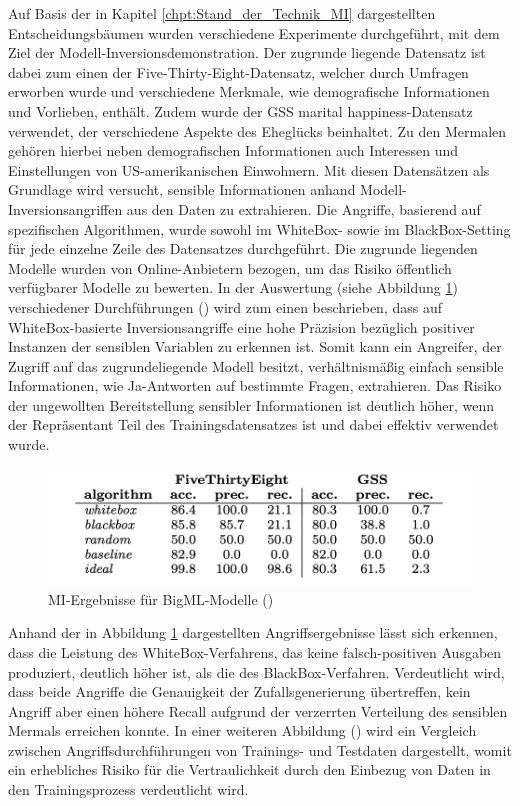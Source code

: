 Auf Basis der in Kapitel \ref{chpt:Stand_der_Technik_MI} dargestellten Entscheidungsbäumen wurden verschiedene Experimente durchgeführt, mit dem Ziel der Modell-Inversionsdemonstration. Der zugrunde liegende Datensatz ist dabei zum einen der \glqq Five-Thirty-Eight\grqq{}-Datensatz, welcher durch Umfragen erworben wurde und verschiedene Merkmale, wie demografische Informationen und Vorlieben, enthält. Zudem wurde der \glqq GSS marital happiness\grqq{}-Datensatz verwendet, der verschiedene Aspekte des Eheglücks beinhaltet. Zu den Mermalen gehören hierbei neben demografischen Informationen auch Interessen und Einstellungen von US-amerikanischen Einwohnern. Mit diesen Datensätzen als Grundlage wird versucht, sensible Informationen anhand Modell-Inversionsangriffen aus den Daten zu extrahieren. Die Angriffe, basierend auf spezifischen Algorithmen, wurde sowohl im WhiteBox- sowie im BlackBox-Setting für jede einzelne Zeile des Datensatzes durchgeführt. Die zugrunde liegenden Modelle wurden von \glqq Online-Anbietern\grqq{} bezogen, um das Risiko öffentlich verfügbarer Modelle zu bewerten. In der Auswertung (siehe Abbildung \ref{img:frederikson_2015_evaluation}) verschiedener Durchführungen (\cite[S. 5 ff.]{fredrikson_model_2015}) wird zum einen beschrieben, dass auf WhiteBox-basierte Inversionsangriffe eine hohe Präzision bezüglich positiver Instanzen der sensiblen Variablen zu erkennen ist. Somit kann ein Angreifer, der Zugriff auf das zugrundeliegende Modell besitzt, verhältnismäßig einfach sensible Informationen, wie \glqq Ja\grqq{}-Antworten auf bestimmte Fragen, extrahieren. Das Risiko der \glqq ungewollten Bereitstellung\grqq{} sensibler Informationen ist deutlich höher, wenn der Repräsentant Teil des Trainingsdatensatzes ist und dabei effektiv verwendet wurde. 
\begin{figure}[H]
	\centering
	\includegraphics[width=0.6\linewidth]{Bilder/frederikson_2015_1.png}
	\caption{MI-Ergebnisse für BigML-Modelle (\cite[S. 6, Figure 4]{fredrikson_model_2015})}
	\label{img:frederikson_2015_evaluation}
\end{figure}
Anhand der in Abbildung \ref{img:frederikson_2015_evaluation} dargestellten Angriffsergebnisse lässt sich erkennen, dass die Leistung des WhiteBox-Verfahrens, das keine falsch-positiven Ausgaben produziert, deutlich höher ist, als die des BlackBox-Verfahren. Verdeutlicht wird, dass beide Angriffe die Genauigkeit der Zufallsgenerierung übertreffen, kein Angriff aber einen höhere Recall aufgrund der verzerrten Verteilung des sensiblen Mermals erreichen konnte. In einer weiteren Abbildung (\cite[S. 7, Figure 5]{fredrikson_model_2015}) wird ein Vergleich zwischen Angriffsdurchführungen von Trainings- und Testdaten dargestellt, womit ein erhebliches Risiko für die Vertraulichkeit durch den Einbezug von Daten in den Trainingsprozess verdeutlicht wird. 

